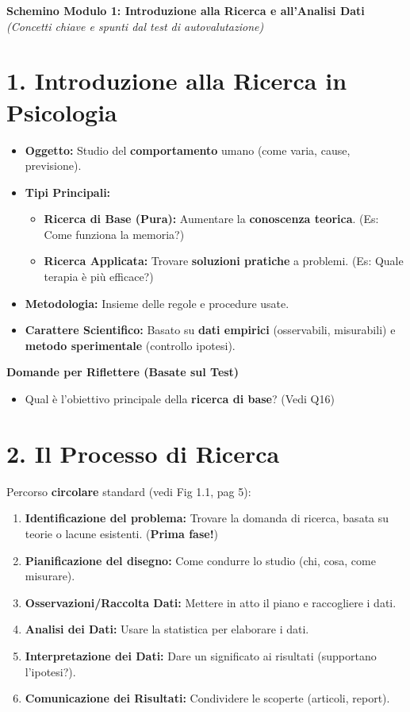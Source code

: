 \documentclass[12pt, a4paper]{article}
\newenvironment{reflectionbox}{%
    \begin{framed}\par\medskip\noindent
    \textbf{\color{boxtitlecolor}Domande per Riflettere (Basate sul Test)} \par
    \begin{itemize}[leftmargin=*, label=$\blacktriangleright$]
}{%
    \end{itemize}\par\medskip
    \end{framed}
}
\begin{document}
\begin{center}
    \Large\textbf{Schemino Modulo 1: Introduzione alla Ricerca e all'Analisi Dati} \\
    \vspace{0.5cm}
    \large\textit{(Concetti chiave e spunti dal test di autovalutazione)}
\end{center}

\section*{1. Introduzione alla Ricerca in Psicologia}
\begin{itemize}
    \item \textbf{Oggetto:} Studio del \textbf{comportamento} umano (come varia, cause, previsione).
    \item \textbf{Tipi Principali:}
        \begin{itemize}
            \item \textbf{Ricerca di Base (Pura):} Aumentare la \textbf{conoscenza teorica}. (Es: Come funziona la memoria?)
            \item \textbf{Ricerca Applicata:} Trovare \textbf{soluzioni pratiche} a problemi. (Es: Quale terapia è più efficace?)
        \end{itemize}
    \item \textbf{Metodologia:} Insieme delle regole e procedure usate.
    \item \textbf{Carattere Scientifico:} Basato su \textbf{dati empirici} (osservabili, misurabili) e \textbf{metodo sperimentale} (controllo ipotesi).
\end{itemize}

\begin{reflectionbox}
    \item Qual è l'obiettivo principale della \textbf{ricerca di base}? (Vedi Q16)
\end{reflectionbox}

\section*{2. Il Processo di Ricerca}
Percorso \textbf{circolare} standard (vedi Fig 1.1, pag 5):
\begin{enumerate}
    \item \textbf{Identificazione del problema:} Trovare la domanda di ricerca, basata su teorie o lacune esistenti. (\textbf{Prima fase!})
    \item \textbf{Pianificazione del disegno:} Come condurre lo studio (chi, cosa, come misurare).
    \item \textbf{Osservazioni/Raccolta Dati:} Mettere in atto il piano e raccogliere i dati.
    \item \textbf{Analisi dei Dati:} Usare la statistica per elaborare i dati.
    \item \textbf{Interpretazione dei Dati:} Dare un significato ai risultati (supportano l'ipotesi?).
    \item \textbf{Comunicazione dei Risultati:} Condividere le scoperte (articoli, report).
\end{enumerate}
\end{document}
